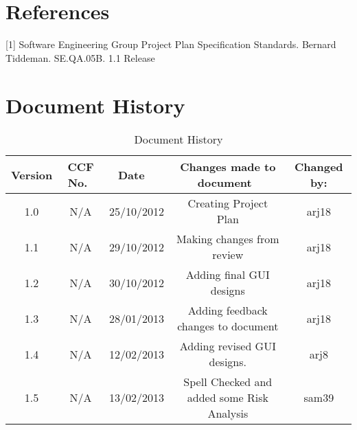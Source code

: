 \documentclass[titlepage]{article}
\begin{document}
\section{References}
[1] Software Engineering Group Project Plan Specification Standards.  Bernard Tiddeman. SE.QA.05B. 1.1 Release
\section{Document History}
\begin{table*}[h]
\caption{Document History}
\centering
\begin{tabular}{|c|c|c|c|c|}
\hline\hline
Version & CCF No.\ & Date \ & Changes made to document\ & Changed by: \\ [0.5ex]
\hline
1.0 & N/A & 25/10/2012 & Creating Project Plan & arj18 \\
\hline
1.1 & N/A  & 29/10/2012 & Making changes from review & arj18 \\
\hline
1.2 & N/A  & 30/10/2012  & Adding final GUI designs & arj18 \\
\hline
1.3 & N/A  & 28/01/2013  & Adding feedback changes to document & arj18  \\ [1ex]	
\hline 
1.4 & N/A & 12/02/2013 & Adding revised GUI designs. & arj8 \\
\hline
1.5 & N/A & 13/02/2013 & Spell Checked and added some Risk Analysis & sam39 \\
\hline
\end{tabular}
\label{table:nonlin}
\end{table*}
\end{document}
